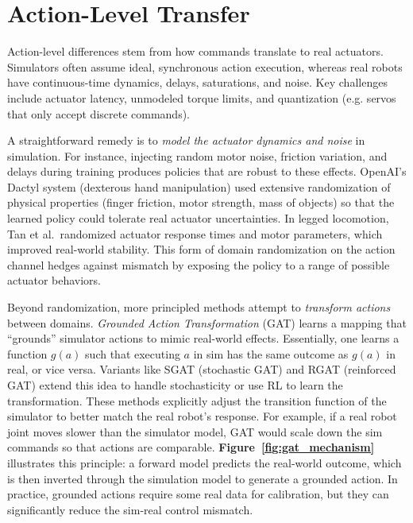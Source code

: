 \section{Action-Level Transfer}
Action-level differences stem from how commands translate to real actuators. Simulators often assume ideal, synchronous action execution, whereas real robots have continuous-time dynamics, delays, saturations, and noise. Key challenges include actuator latency, unmodeled torque limits, and quantization (e.g. servos that only accept discrete commands).

A straightforward remedy is to \emph{model the actuator dynamics and noise} in simulation. For instance, injecting random motor noise, friction variation, and delays during training produces policies that are robust to these effects. OpenAI’s Dactyl system (dexterous hand manipulation) used extensive randomization of physical properties (finger friction, motor strength, mass of objects) so that the learned policy could tolerate real actuator uncertainties\cite{Akkaya2019}. In legged locomotion, Tan et al.\ randomized actuator response times and motor parameters, which improved real-world stability\cite{Tan2018}. This form of domain randomization on the action channel hedges against mismatch by exposing the policy to a range of possible actuator behaviors.

Beyond randomization, more principled methods attempt to \emph{transform actions} between domains. \emph{Grounded Action Transformation} (GAT) learns a mapping that “grounds” simulator actions to mimic real-world effects\cite{Hanna2017}. Essentially, one learns a function $g(a)$ such that executing $a$ in sim has the same outcome as $g(a)$ in real, or vice versa. Variants like SGAT (stochastic GAT) and RGAT (reinforced GAT) extend this idea to handle stochasticity or use RL to learn the transformation\cite{Desai2020,Karnan2020}. These methods explicitly adjust the transition function of the simulator to better match the real robot’s response. For example, if a real robot joint moves slower than the simulator model, GAT would scale down the sim commands so that actions are comparable. \textbf{Figure~\ref{fig:gat_mechanism}} illustrates this principle: a forward model predicts the real-world outcome, which is then inverted through the simulation model to generate a grounded action. In practice, grounded actions require some real data for calibration, but they can significantly reduce the sim-real control mismatch.


